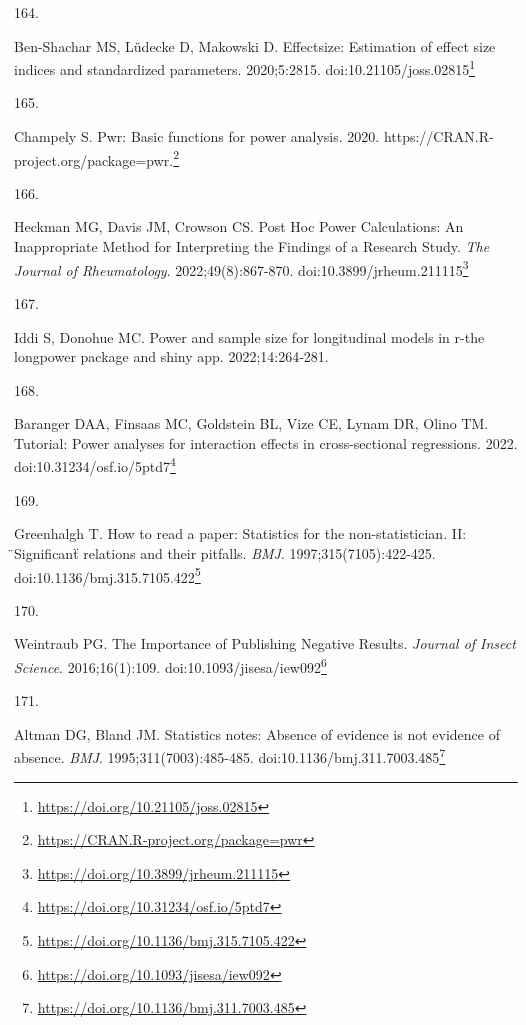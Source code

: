 \documentclass[
  a4paper,
]{book}
\newlength{\cslhangindent}
\newlength{\csllabelwidth}
\newlength{\cslentryspacingunit} %
\newenvironment{CSLReferences}[2] %
 {%
  \setlength{\parindent}{0pt}
  \ifodd #1
  \let\oldpar\par
  \def\par{\hangindent=\cslhangindent\oldpar}
  \fi
  \setlength{\parskip}{#2\cslentryspacingunit}
 }%
 {}
\newcommand{\CSLLeftMargin}[1]{\parbox[t]{\csllabelwidth}{#1}}
\newcommand{\CSLRightInline}[1]{\parbox[t]{\linewidth - \csllabelwidth}{#1}\break}
\renewcommand{\href}[2]{#2\footnote{\url{#1}}}
\begin{document}
\begin{CSLReferences}{0}{0}
\leavevmode{}%
\CSLLeftMargin{164. }%
\CSLRightInline{Ben-Shachar MS, Lüdecke D, Makowski D. {\textbraceleft}E{\textbraceright}ffectsize: Estimation of effect size indices and standardized parameters. 2020;5:2815. doi:\href{https://doi.org/10.21105/joss.02815}{10.21105/joss.02815}}

\leavevmode{}%
\CSLLeftMargin{165. }%
\CSLRightInline{Champely S. Pwr: Basic functions for power analysis. 2020. \href{https://CRAN.R-project.org/package=pwr}{https://CRAN.R-project.org/package=pwr.}}

\leavevmode{}%
\CSLLeftMargin{166. }%
\CSLRightInline{Heckman MG, Davis JM, Crowson CS. Post Hoc Power Calculations: An Inappropriate Method for Interpreting the Findings of a Research Study. \emph{The Journal of Rheumatology}. 2022;49(8):867-870. doi:\href{https://doi.org/10.3899/jrheum.211115}{10.3899/jrheum.211115}}

\leavevmode{}%
\CSLLeftMargin{167. }%
\CSLRightInline{Iddi S, Donohue MC. Power and sample size for longitudinal models in r-the longpower package and shiny app. 2022;14:264-281.}

\leavevmode{}%
\CSLLeftMargin{168. }%
\CSLRightInline{Baranger DAA, Finsaas MC, Goldstein BL, Vize CE, Lynam DR, Olino TM. Tutorial: Power analyses for interaction effects in cross-sectional regressions. 2022. doi:\href{https://doi.org/10.31234/osf.io/5ptd7}{10.31234/osf.io/5ptd7}}

\leavevmode{}%
\CSLLeftMargin{169. }%
\CSLRightInline{Greenhalgh T. How to read a paper: Statistics for the non-statistician. II: {̈}Significant{̈} relations and their pitfalls. \emph{BMJ}. 1997;315(7105):422-425. doi:\href{https://doi.org/10.1136/bmj.315.7105.422}{10.1136/bmj.315.7105.422}}

\leavevmode{}%
\CSLLeftMargin{170. }%
\CSLRightInline{Weintraub PG. The Importance of Publishing Negative Results. \emph{Journal of Insect Science}. 2016;16(1):109. doi:\href{https://doi.org/10.1093/jisesa/iew092}{10.1093/jisesa/iew092}}

\leavevmode{}%
\CSLLeftMargin{171. }%
\CSLRightInline{Altman DG, Bland JM. Statistics notes: Absence of evidence is not evidence of absence. \emph{BMJ}. 1995;311(7003):485-485. doi:\href{https://doi.org/10.1136/bmj.311.7003.485}{10.1136/bmj.311.7003.485}}


\end{CSLReferences}
\end{document}
